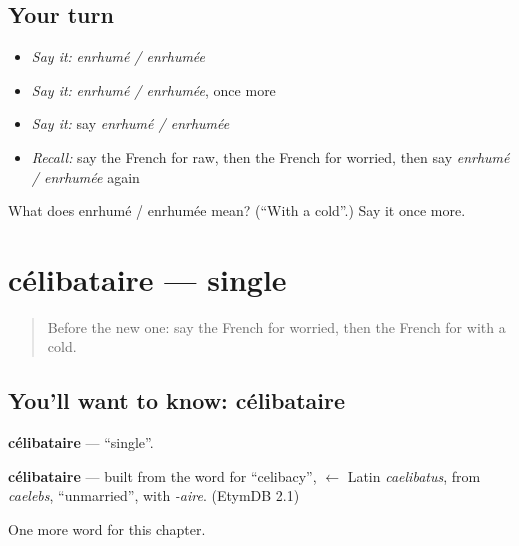 \subsection*{Your turn}
\begin{itemize}
\raggedright
  \item \emph{Say it:} \emph{enrhumé / enrhumée}
  \item \emph{Say it:} \emph{enrhumé / enrhumée}, once more
  \item \emph{Say it:} say \emph{enrhumé / enrhumée}
  \item \emph{Recall:} say the French for raw, then the French for worried, then say \emph{enrhumé / enrhumée} again
\end{itemize}

\begin{tcolorbox}[breakable,colback=teal!4,colframe=teal!35!black,title={Before you move on}]
What does enrhumé / enrhumée mean? (\textquotedblleft{}With a cold\textquotedblright{}.) Say it once more.
\end{tcolorbox}
\section[célibataire]{célibataire — single}

\label{lesson:FR-C162-celibataire}



\begin{quote}
Before the new one: say the French for worried, then the French for with a cold.
\end{quote}

\subsection*{You'll want to know: célibataire}
\textbf{célibataire} — \textquotedblleft{}single\textquotedblright{}.

\begin{cousinweb}
\textbf{célibataire} — built from the word for \textquotedblleft{}celibacy\textquotedblright{}, $\leftarrow$ Latin \emph{caelibatus}, from \emph{caelebs}, \textquotedblleft{}unmarried\textquotedblright{}, with \emph{-aire}. (EtymDB 2.1)
\end{cousinweb}

\begin{grammarlens}[title={What you've built}]
One more word for this chapter.
\end{grammarlens}

